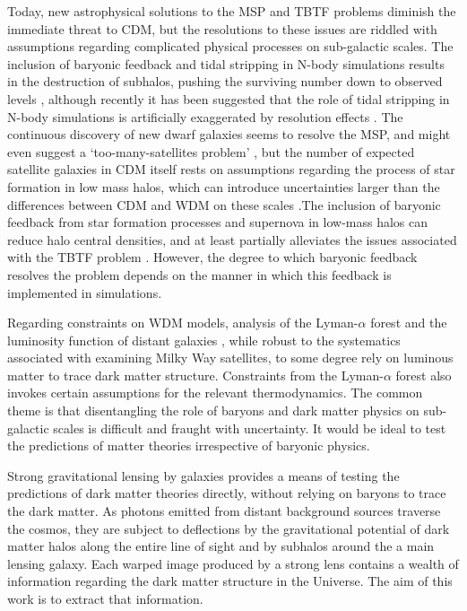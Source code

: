 Today, new astrophysical solutions to the MSP and TBTF problems diminish the immediate threat to CDM, but the resolutions to these issues are riddled with assumptions regarding complicated physical processes on sub-galactic scales. The inclusion of baryonic feedback and tidal stripping in N-body simulations results in the destruction of subhalos, pushing the surviving number down to observed levels \cite{Kim++17}, although recently it has been suggested that the role of tidal stripping in N-body simulations is artificially exaggerated by resolution effects \cite{vandenBosch++18,ErraniPenarrubia19}. The continuous discovery of new dwarf galaxies seems to resolve the MSP, and might even suggest a `too-many-satellites problem' \cite{Kim++17b,Homma++19}, but the number of expected satellite galaxies in CDM itself rests on assumptions regarding the process of star formation in low mass halos, which can introduce uncertainties larger than the differences between CDM and WDM on these scales \cite{Nierenberg++16,Dooley++17,Newton++18}.The inclusion of baryonic feedback from star formation processes and supernova in low-mass halos can reduce halo central densities, and at least partially alleviates the issues associated with the TBTF problem \cite{Tollet++16}. However, the degree to which baryonic feedback resolves the problem depends on the manner in which this feedback is implemented in simulations. 

Regarding constraints on WDM models, analysis of the Lyman-$\alpha$ forest \cite{Viel13,Irsic++17} and the luminosity function of distant galaxies \cite{Menci++16,Castellano++19}, while robust to the systematics associated with examining Milky Way satellites, to some degree rely on luminous matter to trace dark matter structure. Constraints from the Lyman-$\alpha$ forest also invokes certain assumptions for the relevant thermodynamics. The common theme is that disentangling the role of baryons and dark matter physics on sub-galactic scales is difficult and fraught with uncertainty. It would be ideal to test the predictions of matter theories irrespective of baryonic physics. 

Strong gravitational lensing by galaxies provides a means of testing the predictions of dark matter theories directly, without relying on baryons to trace the dark matter. As photons emitted from distant background sources traverse the cosmos, they are subject to deflections by the gravitational potential of dark matter halos along the entire line of sight and by subhalos around the a main lensing galaxy. Each warped image produced by a strong lens contains a wealth of information regarding the dark matter structure in the Universe. The aim of this work is to extract that information. 

